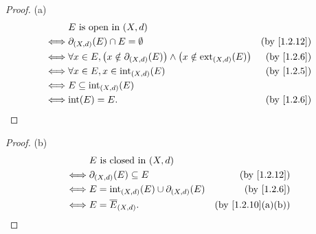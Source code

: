 \begin{proof}{(a)}
  \begin{align*}
         & E \text{ is open in } (X, d)                                                                                                         \\
    \iff & \partial_{(X, d)}(E) \cap E = \emptyset                                                                  & \text{(by \cref{1.2.12})} \\
    \iff & \forall x \in E, \big(x \notin \partial_{(X, d)}(E)\big) \land \big(x \notin \text{ext}_{(X, d)}(E)\big) & \text{(by \cref{1.2.6})}  \\
    \iff & \forall x \in E, x \in \text{int}_{(X, d)}(E)                                                            & \text{(by \cref{1.2.5})}  \\
    \iff & E \subseteq \text{int}_{(X, d)}(E)                                                                                                   \\
    \iff & \text{int}(E) = E.                                                                                       & \text{(by \cref{1.2.6})}
  \end{align*}
\end{proof}

\begin{proof}{(b)}
  \begin{align*}
         & E \text{ is closed in } (X, d)                                                         \\
    \iff & \partial_{(X, d)}(E) \subseteq E                     & \text{(by \cref{1.2.12})}       \\
    \iff & E = \text{int}_{(X, d)}(E) \cup \partial_{(X, d)}(E) & \text{(by \cref{1.2.6})}        \\
    \iff & E = \overline{E}_{(X, d)}.                           & \text{(by \cref{1.2.10}(a)(b))}
  \end{align*}
\end{proof}


